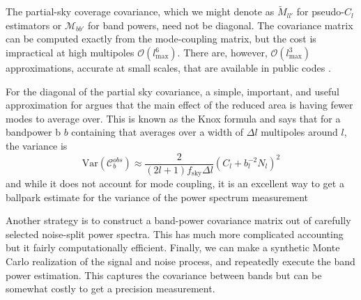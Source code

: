 The partial-sky coverage covariance, which we might denote as $\tilde M_{ll'}$ for pseudo-$C_l$ estimators or $\mathcal{M}_{bb'}$ for band powers, need not be diagonal.  The covariance matrix can be computed exactly from the mode-coupling matrix, but the cost is impractical at high multipoles $\mathcal{O}(l_\textrm{max}^6)$.  There are, however, $\mathcal{O}(l_\textrm{max}^3)$ approximations, accurate at small scales, that are available in public codes \citep{2019JCAP...11..043G}.

For the diagonal of the partial sky covariance, a simple, important, and useful approximation for argues that the main effect of the reduced area is having fewer modes to average over.  This is known as the Knox formula and says that for a bandpower b $b$ containing that averages over a width of $\Delta l$ multipoles around $l$, the variance is
\begin{equation}
\mathrm{Var}(\mathcal{C}^{obs}_b) \approx  \frac{2}{(2l+1)f_\textrm{sky} \Delta l} (C_l + b_l^{-2} N_l)^2
\end{equation}
and while it does not account for mode coupling, it is an excellent way to get a ballpark estimate for the variance of the power spectrum measurement

Another strategy is to construct a band-power covariance matrix out of carefully selected noise-split power spectra.  This has much more complicated accounting but it fairly computationally efficient.  Finally, we can make a synthetic Monte Carlo realization of the signal and noise process, and repeatedly execute the band power estimation.  This captures the covariance between bands but can be somewhat costly to get a precision measurement.


